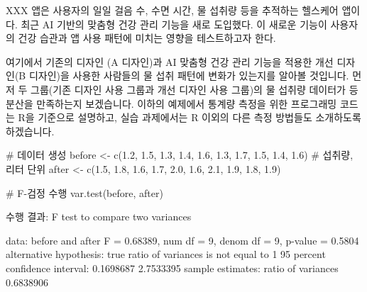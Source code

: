 \documentclass[
  letterpaper,
]{book}
\newenvironment{Shaded}{\begin{snugshade}}{\end{snugshade}}
\newcommand{\CommentTok}[1]{\textcolor[rgb]{0.37,0.37,0.37}{#1}}
\newcommand{\DecValTok}[1]{\textcolor[rgb]{0.68,0.00,0.00}{#1}}
\newcommand{\FloatTok}[1]{\textcolor[rgb]{0.68,0.00,0.00}{#1}}
\newcommand{\FunctionTok}[1]{\textcolor[rgb]{0.28,0.35,0.67}{#1}}
\newcommand{\NormalTok}[1]{\textcolor[rgb]{0.00,0.23,0.31}{#1}}
\newcommand{\OtherTok}[1]{\textcolor[rgb]{0.00,0.23,0.31}{#1}}
\newcommand{\SpecialCharTok}[1]{\textcolor[rgb]{0.37,0.37,0.37}{#1}}
\renewenvironment{Shaded}
    {\begin{snugshade}
    \begin{singlespace}
    \linespread{1}
    }
    {\end{singlespace}
    \end{snugshade}
}
\begin{document}
XXX 앱은 사용자의 일일 걸음 수, 수면 시간, 물 섭취량 등을 추적하는
헬스케어 앱이다. 최근 AI 기반의 맞춤형 건강 관리 기능을 새로 도입했다.
이 새로운 기능이 사용자의 건강 습관과 앱 사용 패턴에 미치는 영향을
테스트하고자 한다.

여기에서 기존의 디자인 (A 디자인)과 AI 맞춤형 건강 관리 기능을 적용한
개선 디자인(B 디자인)을 사용한 사람들의 물 섭취 패턴에 변화가 있는지를
알아볼 것입니다. 먼저 두 그룹(기존 디자인 사용 그룹과 개선 디자인 사용
그룹)의 물 섭취량 데이터가 등분산을 만족하는지 보겠습니다. 이하의
예제에서 통계량 측정을 위한 프로그래밍 코드는 R을 기준으로 설명하고,
실습 과제에서는 R 이외의 다른 측정 방법들도 소개하도록 하겠습니다.

\begin{Shaded}
\begin{Highlighting}[]
\CommentTok{\# 데이터 생성}
\NormalTok{before }\OtherTok{\textless{}{-}} \FunctionTok{c}\NormalTok{(}\FloatTok{1.2}\NormalTok{, }\FloatTok{1.5}\NormalTok{, }\FloatTok{1.3}\NormalTok{, }\FloatTok{1.4}\NormalTok{, }\FloatTok{1.6}\NormalTok{, }\FloatTok{1.3}\NormalTok{, }\FloatTok{1.7}\NormalTok{, }\FloatTok{1.5}\NormalTok{, }\FloatTok{1.4}\NormalTok{, }\FloatTok{1.6}\NormalTok{)  }\CommentTok{\# 섭취량, 리터 단위}
\NormalTok{after }\OtherTok{\textless{}{-}} \FunctionTok{c}\NormalTok{(}\FloatTok{1.5}\NormalTok{, }\FloatTok{1.8}\NormalTok{, }\FloatTok{1.6}\NormalTok{, }\FloatTok{1.7}\NormalTok{, }\FloatTok{2.0}\NormalTok{, }\FloatTok{1.6}\NormalTok{, }\FloatTok{2.1}\NormalTok{, }\FloatTok{1.9}\NormalTok{, }\FloatTok{1.8}\NormalTok{, }\FloatTok{1.9}\NormalTok{)}

\CommentTok{\# F{-}검정 수행}
\FunctionTok{var.test}\NormalTok{(before, after)}
\end{Highlighting}
\end{Shaded}

\begin{Shaded}
\begin{Highlighting}[]
\NormalTok{수행 결과}\SpecialCharTok{:}
\NormalTok{F test to compare two variances}

\NormalTok{data}\SpecialCharTok{:}\NormalTok{  before and after}
\NormalTok{F }\OtherTok{=} \FloatTok{0.68389}\NormalTok{, num df }\OtherTok{=} \DecValTok{9}\NormalTok{, denom df }\OtherTok{=} \DecValTok{9}\NormalTok{, p}\SpecialCharTok{{-}}\NormalTok{value }\OtherTok{=} \FloatTok{0.5804}
\NormalTok{alternative hypothesis}\SpecialCharTok{:}\NormalTok{ true ratio of variances is not equal to }\DecValTok{1}
\DecValTok{95}\NormalTok{ percent confidence interval}\SpecialCharTok{:}
 \FloatTok{0.1698687} \FloatTok{2.7533395}
\NormalTok{sample estimates}\SpecialCharTok{:}
\NormalTok{ratio of variances }
         \FloatTok{0.6838906} 
\end{Highlighting}
\end{Shaded}
\end{document}
